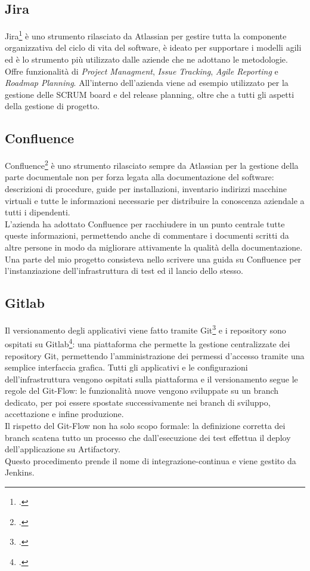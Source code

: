 \subsection{Jira}
Jira\footcite{site:jira} è uno strumento rilasciato da Atlassian per gestire tutta la componente organizzativa del ciclo di vita del software, è ideato per supportare i modelli agili ed è lo strumento più utilizzato dalle aziende che ne adottano le metodologie. \\
Offre funzionalità di \textit{Project Managment}, \textit{Issue Tracking}, \textit{Agile Reporting} e \textit{Roadmap Planning}.
All'interno dell'azienda viene ad esempio utilizzato per la gestione delle SCRUM board e del release planning, oltre che a tutti gli aspetti della gestione di progetto.
\subsection{Confluence}
Confluence\footcite{site:confluence} è uno strumento rilasciato sempre da Atlassian per la gestione della parte documentale non per forza legata alla documentazione del software: descrizioni di procedure, guide per installazioni, inventario indirizzi macchine virtuali e tutte le informazioni necessarie per distribuire la conoscenza aziendale a tutti i dipendenti. \\
L'azienda ha adottato Confluence per racchiudere in un punto centrale tutte queste informazioni, permettendo anche di commentare i documenti scritti da altre persone in modo da migliorare attivamente la qualità della documentazione. \\
Una parte del mio progetto consisteva nello scrivere una guida su Confluence per l'instanziazione dell'infrastruttura di test ed il lancio dello stesso.
\subsection{Gitlab}
Il versionamento degli applicativi viene fatto tramite Git\footcite{site:git} e i repository sono ospitati su Gitlab\footcite{site:gitlab}: una piattaforma che permette la gestione centralizzate dei repository Git, permettendo l'amministrazione dei permessi d'accesso tramite una semplice interfaccia grafica.
Tutti gli applicativi e le configurazioni dell'infrastruttura vengono ospitati sulla piattaforma e il versionamento segue le regole del Git-Flow: le funzionalità nuove vengono sviluppate su un branch dedicato, per poi essere spostate successivamente nei \gls{branch} di sviluppo, accettazione e infine produzione. \\
Il rispetto del Git-Flow non ha solo scopo formale: la definizione corretta dei branch scatena tutto un processo che dall'esecuzione dei test effettua il \gls{deploy} dell'applicazione su Artifactory. \\
Questo procedimento prende il nome di \gls{integrazione-continua} e viene gestito da Jenkins.
